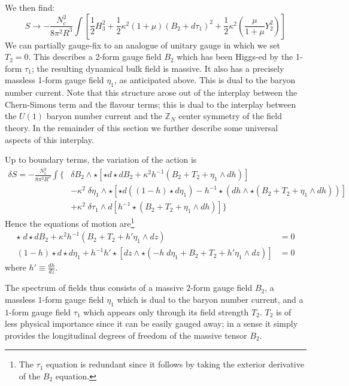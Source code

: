 \documentclass[aps,preprint,nofootinbib,preprintnumbers,eqsecnum,superscriptaddress]{revtex4}
\begin{document}
We then find:
\begin{equation}
	\label{noFermionMass}
	S \to -\frac{N_c^2}{8 \pi^2 R^3}\int{\left[\frac{1}{2} H_3^2 +  \frac{1}{2}\kappa^2 (1+\mu) (B_2 + d\tau_1) ^2 + \frac{1}{2} \kappa^2 \left(\frac{\mu}{1+\mu} Y_2^2\right) \right]}
\end{equation}
We can partially gauge-fix to an analogue of unitary gauge in which we set $T_2 = 0$. This describes a 2-form gauge field $B_2$ which has been Higgs-ed by the 1-form $\tau_1$; the resulting dynamical bulk field is massive. It also has a precisely massless 1-form gauge field $\eta_1$, as anticipated above. This is dual to the baryon number current. Note that this structure arose out of the interplay between the Chern-Simons term and the flavour terms; this is dual to the interplay between the $U(1)$ baryon number current and the $\mathbb{Z}_N$ center symmetry of the field theory. In the remainder of this section we further describe some universal aspects of this interplay. 

Up to boundary terms, the variation of the action is 
\begin{equation}
	\begin{split}
	\delta S
	= - \frac{N_c^2}{8 \pi^2 R^3} \int \bigg \{
	& \delta B_2 \wedge \star \left[\star d \star dB_2 + \kappa^2 h^{-1} (B_2 + T_2 + \eta_1 \wedge dh) \right]	\\
	& - \kappa^2 \; \delta \eta_1 \wedge \star \left[\star d((1-h) \star d \eta_1) -h^{-1} \star (dh \wedge \star (B_2 + T_2 + \eta_1 \wedge dh)) \right]	\\
	& + \kappa^2 \; \delta \tau_1 \wedge d \left[h^{-1} \star (B_2 + T_2 + \eta_1 \wedge dh) \right] \bigg \}
	\end{split}
\end{equation}
Hence the equations of motion are\footnote{The $\tau_1$ equation is redundant since it follows by taking the exterior derivative of the $B_2$ equation.}
\begin{subequations}
	\label{1-form-eom}
	\begin{align}
		\star \; d \star d B_2 +  \kappa^2 h^{-1} (B_2 + T_2 + h' \eta_1 \wedge dz) &= 0		\\
		(1-h) \star d \star d \eta_1 + h^{-1} h' \star [dz \wedge \star (-h \; d\eta_1 + B_2 + T_2 + h' \eta_1 \wedge dz)] &= 0
	\end{align}
\end{subequations}
where $h' \equiv \frac{dh}{dz}$.

The spectrum of fields thus consists of a massive $2$-form gauge field $B_2$, a massless $1$-form gauge field $\eta_1$ which is dual to the baryon number current, and a $1$-form gauge field $\tau_1$ which appears only through its field strength $T_2$. $T_2$ is of less physical importance since it can be easily gauged away; in a sense it simply provides the longitudinal degrees of freedom of the massive tensor $B_2$. 
\end{document}
